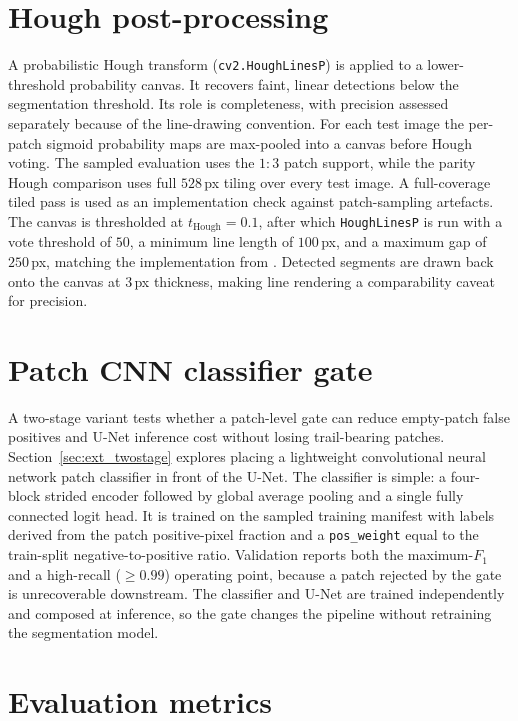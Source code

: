 \documentclass{cam-thesis}
\begin{document}
\section{Hough post-processing}
\label{sec:hough}

A probabilistic Hough transform \citep{matas2000} (\texttt{cv2.HoughLinesP}) is
applied to a lower-threshold probability canvas. It recovers faint, linear detections
below the segmentation threshold. Its role is completeness, with precision
assessed separately because of the line-drawing convention.
For each test image the per-patch sigmoid probability maps are max-pooled into
a canvas before Hough voting. The sampled evaluation uses the $1{:}3$ patch
support, while the parity Hough comparison uses full $528$\,px tiling over every
test image. A full-coverage tiled pass is used as an implementation check against
patch-sampling artefacts. The canvas is thresholded at $t_{\mathrm{Hough}}=0.1$,
after which \texttt{HoughLinesP} is run with a vote threshold of $50$, a minimum
line length of $100$\,px, and a maximum gap of $250$\,px, matching the implementation
from \citet{stoppa2024}. Detected segments are drawn back onto the canvas at $3$\,px
thickness, making line rendering a comparability caveat for precision.

\section{Patch CNN classifier gate}
\label{sec:classifier}

A two-stage variant tests whether a patch-level gate can reduce
empty-patch false positives and U-Net inference cost without losing trail-bearing
patches. Section~\ref{sec:ext_twostage} explores placing a lightweight
convolutional neural network patch classifier in front of the U-Net. The
classifier is simple: a four-block strided encoder followed by
global average pooling and a single fully connected logit head. It is trained on
the sampled training manifest with labels derived from the patch
positive-pixel fraction and a \texttt{pos\_weight} equal to the train-split
negative-to-positive ratio.
Validation reports both the maximum-$F_1$ and a high-recall
($\ge0.99$) operating point, because a patch rejected by the gate is
unrecoverable downstream. The classifier and U-Net are trained independently
and composed at inference, so the gate changes the pipeline without
retraining the segmentation model.

\section{Evaluation metrics}
\label{sec:metrics}
\end{document}
